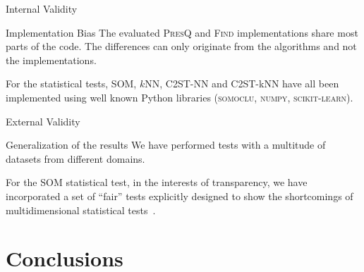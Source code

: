 \documentclass[10pt,notes]{beamer}
\newcommand{\PresQ}[0]{\textsc{PresQ}\xspace}
\begin{document}
\begin{frame}{Internal Validity}
    \begin{alertblock}{Implementation Bias}
        \smallskip
        The evaluated \PresQ and \textsc{Find} implementations share most parts of the code. The differences can only originate
        from the algorithms and not the implementations.
        
        \smallskip
        
        For the statistical tests, SOM, $k$NN, C2ST-NN and C2ST-kNN have all been implemented using well known
        Python libraries (\textsc{somoclu}, \textsc{numpy}, \textsc{scikit-learn}).
    \end{alertblock}
\end{frame}

\begin{frame}{External Validity}
    \begin{alertblock}{Generalization of the results}
        \smallskip
        We have performed tests with a multitude of datasets from different domains.
        
        \smallskip

        For the SOM statistical test, in the interests of transparency, we have incorporated a set
        of ``fair'' tests explicitly designed to show the shortcomings of multidimensional statistical tests~\cite{ramdas2015decreasing}.
        
    \end{alertblock}
\end{frame}

\section{Conclusions}


\end{document}
